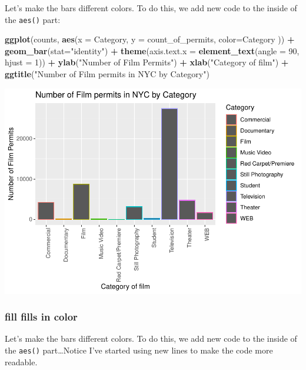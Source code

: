 \documentclass[
]{book}
\newenvironment{Shaded}{\begin{snugshade}}{\end{snugshade}}
\newcommand{\AttributeTok}[1]{\textcolor[rgb]{0.13,0.29,0.53}{#1}}
\newcommand{\DecValTok}[1]{\textcolor[rgb]{0.00,0.00,0.81}{#1}}
\newcommand{\FunctionTok}[1]{\textcolor[rgb]{0.13,0.29,0.53}{\textbf{#1}}}
\newcommand{\NormalTok}[1]{#1}
\newcommand{\SpecialCharTok}[1]{\textcolor[rgb]{0.81,0.36,0.00}{\textbf{#1}}}
\newcommand{\StringTok}[1]{\textcolor[rgb]{0.31,0.60,0.02}{#1}}
\begin{document}
Let's make the bars different colors. To do this, we add new code to the inside of the \texttt{aes()} part:

\begin{Shaded}
\begin{Highlighting}[]
\FunctionTok{ggplot}\NormalTok{(counts, }\FunctionTok{aes}\NormalTok{(}\AttributeTok{x =}\NormalTok{ Category, }\AttributeTok{y =}\NormalTok{ count\_of\_permits, }\AttributeTok{color=}\NormalTok{Category )) }\SpecialCharTok{+}
  \FunctionTok{geom\_bar}\NormalTok{(}\AttributeTok{stat=}\StringTok{"identity"}\NormalTok{) }\SpecialCharTok{+} 
  \FunctionTok{theme}\NormalTok{(}\AttributeTok{axis.text.x =} \FunctionTok{element\_text}\NormalTok{(}\AttributeTok{angle =} \DecValTok{90}\NormalTok{, }\AttributeTok{hjust =} \DecValTok{1}\NormalTok{)) }\SpecialCharTok{+}
  \FunctionTok{ylab}\NormalTok{(}\StringTok{"Number of Film Permits"}\NormalTok{) }\SpecialCharTok{+} 
  \FunctionTok{xlab}\NormalTok{(}\StringTok{"Category of film"}\NormalTok{) }\SpecialCharTok{+}
  \FunctionTok{ggtitle}\NormalTok{(}\StringTok{"Number of Film permits in NYC by Category"}\NormalTok{)}
\end{Highlighting}
\end{Shaded}

\includegraphics{Statistics_Lab_files/figure-latex/1categoryF-1.pdf}

\hypertarget{fill-fills-in-color}{%
\subsubsection{fill fills in color}\label{fill-fills-in-color}}

Let's make the bars different colors. To do this, we add new code to the inside of the \texttt{aes()} part\ldots Notice I've started using new lines to make the code more readable.
\end{document}
